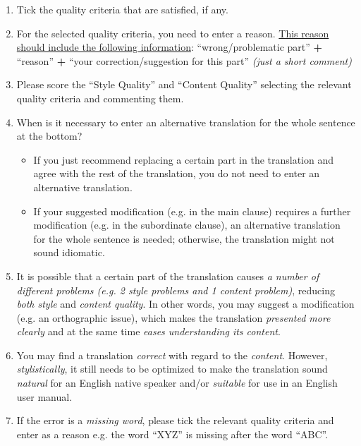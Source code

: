 \begin{enumerate}
\item Tick the quality criteria that are  satisfied, if any.
\item For the selected quality criteria, you need to enter a reason. \ul{This reason should include the following information}:
“wrong/problematic part” \textbf{+} “reason” \textbf{+} “your correction/suggestion for this part”  \textit{(just a short comment)}

\item Please score the “Style Quality” and “Content Quality”  selecting the relevant quality criteria and commenting them.
\item When is it necessary to enter an alternative translation for the whole sentence at the bottom?

  \begin{itemize}
  \item If you just recommend replacing a certain part in the translation and agree with the rest of the translation, you do not need to enter an alternative translation.
  \item If your suggested modification (e.g. in the main clause) requires a further modification (e.g. in the subordinate clause), an alternative translation for the whole sentence is needed; otherwise, the translation might not sound idiomatic.
  \end{itemize}

\item It is possible that a certain part of the translation causes \textit{a number of different problems (e.g. 2 style problems and 1 content problem)}, reducing \textit{both style} and \textit{content quality}. In other words, you may suggest a modification (e.g. an orthographic issue), which makes the translation \textit{presented more clearly} and at the same time \textit{eases understanding its content}.
\item You may find a translation \textit{correct} with regard to the \textit{content}. However, \textit{stylistically}, it still needs to be optimized to make the translation sound \textit{natural} for an English native speaker and/or \textit{suitable} for use in an English user manual.
\item If the error is a \textit{missing word}, please tick the relevant quality criteria and enter as a reason e.g. the word “XYZ” is missing after the word “ABC”.
\end{enumerate}




